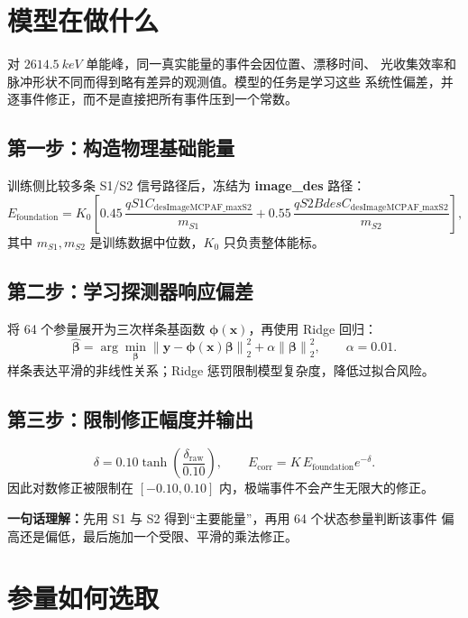 \documentclass[UTF8,11pt,a4paper,fontset=none]{ctexart}
\begin{document}
\section{模型在做什么}

对 \(\SI{2614.5}{keV}\) 单能峰，同一真实能量的事件会因位置、漂移时间、
光收集效率和脉冲形状不同而得到略有差异的观测值。模型的任务是学习这些
系统性偏差，并逐事件修正，而不是直接把所有事件压到一个常数。

\subsection{第一步：构造物理基础能量}

训练侧比较多条 S1/S2 信号路径后，冻结为 \textbf{image\_des} 路径：
\[
E_{\mathrm{foundation}}
=K_0\!\left[
0.45\,\frac{qS1C_{\mathrm{desImageMCPAF\_maxS2}}}{m_{S1}}
+0.55\,\frac{qS2BdesC_{\mathrm{desImageMCPAF\_maxS2}}}{m_{S2}}
\right],
\]
其中 \(m_{S1},m_{S2}\) 是训练数据中位数，\(K_0\) 只负责整体能标。

\subsection{第二步：学习探测器响应偏差}

将 64 个参量展开为三次样条基函数 \(\symbf{\phi}(\symbf{x})\)，再使用 Ridge 回归：
\[
\hat{\symbf{\beta}}
=\arg\min_{\symbf{\beta}}
\left\|\symbf{y}-\symbf{\phi}(\symbf{x})\symbf{\beta}\right\|_2^2
+\alpha\left\|\symbf{\beta}\right\|_2^2,
\qquad \alpha=0.01 .
\]
样条表达平滑的非线性关系；Ridge 惩罚限制模型复杂度，降低过拟合风险。

\subsection{第三步：限制修正幅度并输出}

\[
\delta=0.10\tanh\!\left(\frac{\delta_{\mathrm{raw}}}{0.10}\right),
\qquad
E_{\mathrm{corr}}=K\,E_{\mathrm{foundation}}e^{-\delta}.
\]
因此对数修正被限制在 \([-0.10,0.10]\) 内，极端事件不会产生无限大的修正。

\begin{keybox}
\textbf{一句话理解：}先用 S1 与 S2 得到“主要能量”，再用 64 个状态参量判断该事件
偏高还是偏低，最后施加一个受限、平滑的乘法修正。
\end{keybox}

\clearpage
\section{参量如何选取}
\end{document}

